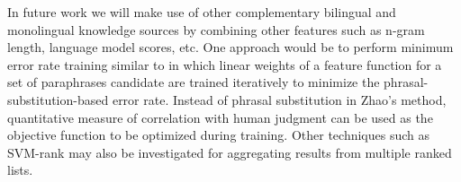 \documentclass[11pt]{article}
\begin{document}
{{In future work we will make use of other complementary bilingual and monolingual knowledge sources by combining other features such as n-gram length, language model scores, etc. One approach would be to perform minimum error rate training similar to  in which linear weights of a feature function for a set of paraphrases candidate are trained iteratively to minimize the phrasal-substitution-based error rate. Instead of phrasal substitution in Zhao's method, quantitative measure of correlation with human judgment can be used as the objective function to be optimized during training. Other techniques such as SVM-rank \cite{Joachims02} may also be investigated for aggregating results from multiple ranked lists. 



}}
\end{document}
